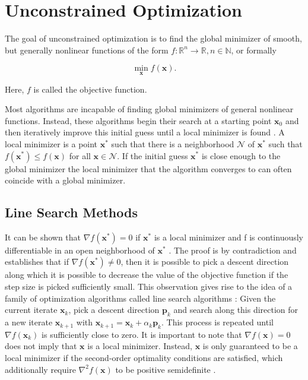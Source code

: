 \section{Unconstrained Optimization}\label{s:unconstrained-optimization}
The goal of unconstrained optimization is to find the global minimizer of smooth, but generally nonlinear functions of the form $f \colon 
\mathbb{R}^n \to \mathbb{R}, n \in \mathbb{N}$, or formally

\[
    \min_{\bm{x}} f(\bm{x}).
\]

\noindent Here, $f$ is called the objective function. 

Most algorithms are incapable of finding global minimizers of general nonlinear functions. 
Instead, these algorithms begin their search at a starting point $\bm{x}_0$ and then iteratively improve this initial guess until a local 
minimizer is found \cite{nocedal2006}. A local minimizer is a point $\bm{x}^*$ such that there is a neighborhood $\mathcal{N}$ of 
$\bm{x}^*$ such that $f(\bm{x}^*) \leq f(\bm{x})$ for all $\bm{x} \in \mathcal{N}$. If the initial guess $\bm{x}^*$ is close enough 
to the global minimizer the local minimizer that the algorithm converges to can often coincide with a global minimizer. 

\subsection{Line Search Methods}\label{ss:line-search}
It can be shown that $\nabla f(\bm{x}^*) = 0$ if $\bm{x}^*$ is a local minimizer and f is continuously differentiable in an open neighborhood
of $\bm{x}^*$ \cite{nocedal2006}. The proof is by contradiction and establishes that if $\nabla f(\bm{x}^*) \neq 0$, then it is possible to pick a descent 
direction along which it is possible to decrease the value of the objective function if the step size is picked sufficiently small. This 
observation gives rise to the idea of a family of optimization algorithms called line search algorithms \cite{nocedal2006}: Given the current 
iterate $\bm{x}_k$, pick a descent direction $\bm{p}_k$ and search along this direction for a new iterate $\bm{x}_{k+1}$ with $\bm{x}_{k+1} = 
\bm{x}_k + \alpha_k \bm{p}_k$. This process is repeated until $\nabla f(\bm{x}_k)$ is sufficiently close to zero. It is important to note that 
$\nabla f(\bm{x}) = 0$ does not imply that $\bm{x}$ is a local minimizer. Instead, $\bm{x}$ is only guaranteed to be a local minimizer if 
the second-order 
optimality conditions are satisfied, which additionally require $\nabla^2 f(\bm{x})$ to be positive semidefinite \cite{nocedal2006}.

